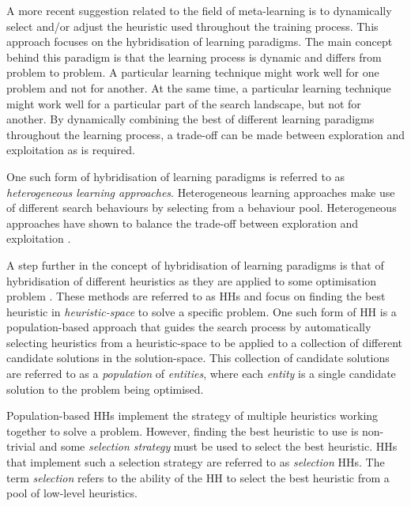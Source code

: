 A more recent suggestion related to the field of meta-learning is to dynamically select and/or adjust the heuristic used throughout the training process. This approach focuses on the hybridisation of learning paradigms. The main concept behind this paradigm is that the learning process is dynamic and differs from problem to problem. A particular learning technique might work well for one problem and not for another. At the same time, a particular learning technique might work well for a particular part of the search landscape, but not for another. By dynamically combining the best of different learning paradigms throughout the learning process, a trade-off can be made between exploration and exploitation as is required.

One such form of hybridisation of learning paradigms is referred to as \textit{heterogeneous learning approaches}. Heterogeneous learning approaches make use of different search behaviours by selecting from a behaviour pool. Heterogeneous approaches have shown to balance the trade-off between exploration and exploitation \cite{ref:nepomuceno:2013}.

A step further in the concept of hybridisation of learning paradigms is that of hybridisation of different heuristics as they are applied to some optimisation problem \cite{ref:burke:2013}. These methods are referred to as \acfp{HH} and focus on finding the best heuristic in \textit{heuristic-space} to solve a specific problem. One such form of \ac{HH} is a
population-based approach that guides the search process by automatically
selecting heuristics from a heuristic-space to be applied to a collection of
different candidate solutions in the solution-space. This collection of
candidate solutions are referred to as a \textit{population} of
\textit{entities}, where each \textit{entity} is a single candidate solution to
the problem being optimised.

Population-based \acp{HH} implement the strategy of multiple heuristics working
together to solve a problem. However, finding the best heuristic to use is
non-trivial and some \textit{selection strategy} must be used to select the best
heuristic. \acp{HH} that implement such a selection strategy are referred to as
\textit{selection} \acp{HH}. The term \textit{selection} refers to the ability
of the \ac{HH} to select the best heuristic from a pool of low-level heuristics.

